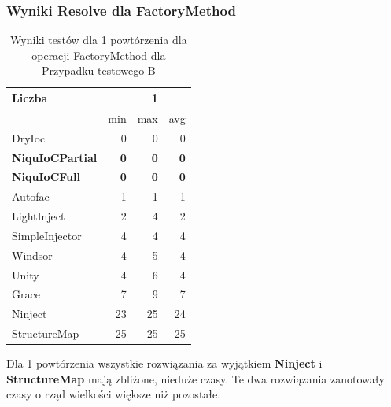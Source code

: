 \documentclass[12pt]{article}
\begin{document}
\subsubsection{Wyniki Resolve dla FactoryMethod}
\begin{table}[H]
\captionsetup{belowskip=0pt,aboveskip=0pt}
\begin{center}
\begin{small}
	\begin{tabular}{ | l | r r r | }
    		\hline
Liczba & & 1 & \\ \hline
 & min & max & avg \\ \hline
DryIoc & 0 & 0 & 0 \\ \hline
\textbf{NiquIoCPartial} & \textbf{0} & \textbf{0} & \textbf{0} \\ \hline
\textbf{NiquIoCFull} & \textbf{0} & \textbf{0} & \textbf{0} \\ \hline
Autofac & 1 & 1 & 1 \\ \hline
LightInject & 2 & 4 & 2 \\ \hline
SimpleInjector & 4 & 4 & 4 \\ \hline
Windsor & 4 & 5 & 4 \\ \hline
Unity & 4 & 6 & 4 \\ \hline
Grace & 7 & 9 & 7 \\ \hline
Ninject & 23 & 25 & 24 \\ \hline
StructureMap & 25 & 25 & 25 \\ \hline
  	\end{tabular}
\end{small}
\end{center}
\caption{Wyniki testów dla 1 powtórzenia dla operacji FactoryMethod dla Przypadku testowego B}
\label{TestCaseB_FactoryMethod1}
\end{table}
Dla 1 powtórzenia wszystkie rozwiązania za wyjątkiem \textbf{Ninject} i \textbf{StructureMap} mają zbliżone, nieduże czasy. Te dwa rozwiązania zanotowały czasy o rząd wielkości większe niż pozostałe.
\\
\end{document}
